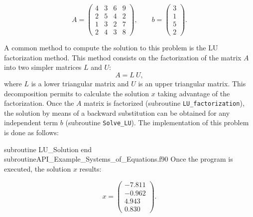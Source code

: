     \begin{equation}
    	A = \begin{pmatrix}
    	4 & 3 & 6 & 9 \\
    	2 & 5 & 4 & 2 \\
    	1 & 3 & 2 & 7 \\
    	2 & 4 & 3 & 8 
    	\end{pmatrix}, \qquad 
    	b = \begin{pmatrix}
    	3 \\
    	1 \\
    	5 \\
    	2
    	\end{pmatrix}.
    \end{equation}
    
    A common method to compute the solution to this problem is the LU factorization method. This method consists on the factorization of the matrix $A$ into two simpler matrices $L$ and $U$:
    \begin{equation*}
    	A = L \ U,
    \end{equation*}
    where $L$ is a lower triangular matrix and $U$ is an upper triangular matrix. This decomposition permits to calculate the solution $x$ 
    taking advantage of the factorization. Once the $A$ matrix is factorized (subroutine \verb|LU_factorization|), the solution by means of a 
    backward substitution can be obtained for any independent term $b$ (subroutine \verb|Solve_LU|). The implementation of this problem is 
    done as follows:
    
    \vspace{0.5cm} 
    {subroutine LU_Solution}
    {end subroutine}{API_Example_Systems_of_Equations.f90}
    Once the program is executed, the solution $x$ results:
    
    \begin{equation}
    x = 
    \begin{pmatrix}
    -7.811 \\
    -0.962 \\
     4.943 \\
     0.830
    \end{pmatrix}.
    \end{equation}
    
